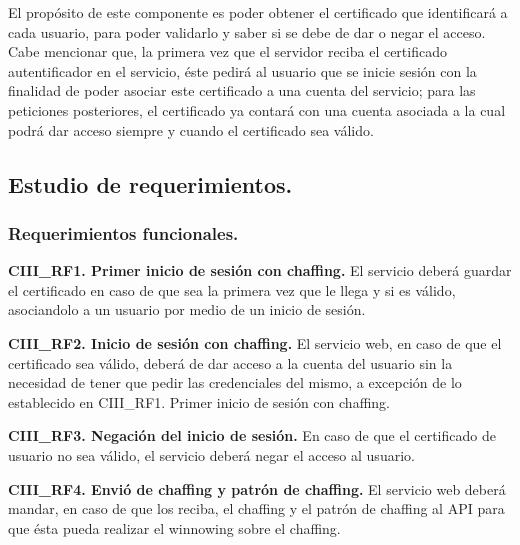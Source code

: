 \documentclass[12pt, a4paper, titlepage]{report}
\begin{document}
                El propósito de este componente es poder obtener el certificado que identificará a cada usuario, para poder validarlo y saber si se debe de dar o negar el acceso. Cabe mencionar que, la primera vez que el servidor reciba el certificado autentificador en el servicio, éste pedirá al usuario que se inicie sesión con la finalidad de poder asociar este certificado a una cuenta del servicio; para las peticiones posteriores, el certificado ya contará con una cuenta asociada a la cual podrá dar acceso siempre y cuando el certificado sea válido.\\
            
	        \subsection{Estudio de requerimientos.}
	            \subsubsection{Requerimientos funcionales.}
	            
	            
    	            \textbf{CIII\_RF1. Primer inicio de sesión con chaffing.} El servicio deberá guardar el certificado en caso de que sea la primera vez que le llega y si es válido, asociandolo a un usuario por medio de un inicio de sesión.\\
    	            \label{CIII_RF1}
    	            
    	            \textbf{CIII\_RF2. Inicio de sesión con chaffing.} El servicio web, en caso de que el certificado sea válido, deberá de dar acceso a la cuenta del usuario sin la necesidad de tener que pedir las credenciales del mismo, a excepción de lo establecido en CIII\_RF1. Primer inicio de sesión con chaffing.\\
    	            \label{CIII_RF2}
    	            
    	            \textbf{CIII\_RF3. Negación del inicio de sesión.} En caso de que el certificado de usuario no sea válido, el servicio deberá negar el acceso al usuario.\\
    	            \label{CIII_RF3}
    	            
    	            \textbf{CIII\_RF4. Envió de chaffing y patrón de chaffing.} El servicio web deberá mandar, en caso de que los reciba, el chaffing y el patrón de chaffing al API para que ésta pueda realizar el winnowing sobre el chaffing.\\
    	            \label{CIII_RF4}
    	            
\end{document}
